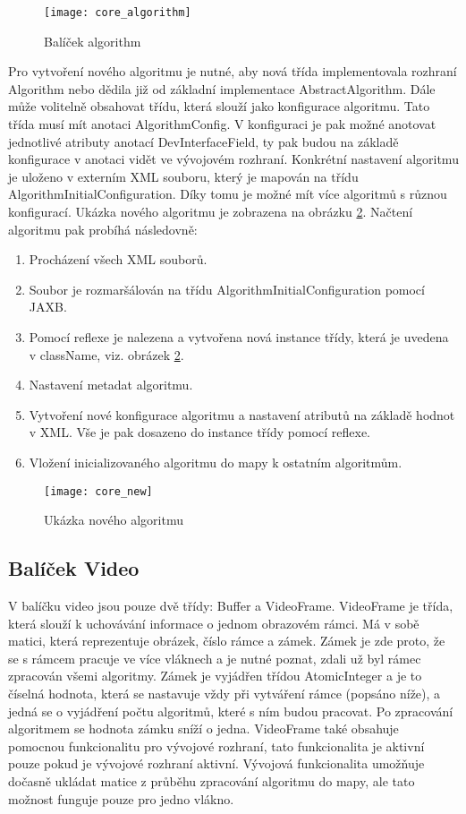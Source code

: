 \begin{figure}[h]
	\texttt{[image: core\_algorithm]}
	\centering
	\caption{Balíček algorithm \label{fig:core_algorithm}}
\end{figure} 
\FloatBarrier
Pro vytvoření nového algoritmu je nutné, aby nová třída implementovala rozhraní Algorithm nebo dědila již od základní implementace AbstractAlgorithm. Dále může volitelně obsahovat třídu, která slouží jako konfigurace algoritmu. Tato třída musí mít anotaci AlgorithmConfig. V konfiguraci je pak možné anotovat jednotlivé atributy anotací DevInterfaceField, ty pak budou na základě konfigurace v anotaci vidět ve vývojovém rozhraní. Konkrétní nastavení algoritmu je uloženo v externím XML souboru, který je mapován na třídu AlgorithmInitialConfiguration. Díky tomu je možné mít více algoritmů s různou konfigurací. Ukázka nového algoritmu je zobrazena na obrázku \ref{fig:core_new}. Načtení algoritmu pak probíhá následovně:
\begin{enumerate}
	\item Procházení všech XML souborů.
	\item Soubor je rozmaršálován na třídu AlgorithmInitialConfiguration pomocí JAXB.
	\item Pomocí reflexe je nalezena a vytvořena nová instance třídy, která je uvedena v className, viz. obrázek \ref{fig:core_new}.
	\item Nastavení metadat algoritmu.
	\item Vytvoření nové konfigurace algoritmu a nastavení atributů na základě hodnot v XML. Vše je pak dosazeno do instance třídy pomocí reflexe.
	\item Vložení inicializovaného algoritmu do mapy k ostatním algoritmům.
\end{enumerate}

\begin{figure}[h]
	\texttt{[image: core\_new]}
	\centering
	\caption{Ukázka nového algoritmu \label{fig:core_new}}
\end{figure} 
\FloatBarrier

\subsection{Balíček Video}
V balíčku video jsou pouze dvě třídy: Buffer a VideoFrame. VideoFrame je třída, která slouží k uchovávání informace o jednom obrazovém rámci. Má v sobě matici, která reprezentuje obrázek, číslo rámce a zámek. Zámek je zde proto, že se s rámcem pracuje ve více vláknech a je nutné poznat, zdali už byl rámec zpracován všemi algoritmy. Zámek je vyjádřen třídou AtomicInteger a je to číselná hodnota, která se nastavuje vždy při vytváření rámce (popsáno níže), a jedná se o vyjádření počtu algoritmů, které s ním budou pracovat. Po zpracování algoritmem se hodnota zámku sníží o jedna. VideoFrame také obsahuje pomocnou funkcionalitu pro vývojové rozhraní, tato funkcionalita je aktivní pouze pokud je vývojové rozhraní aktivní. Vývojová funkcionalita umožňuje dočasně ukládat matice z průběhu zpracování algoritmu do mapy, ale tato možnost funguje pouze pro jedno vlákno.

